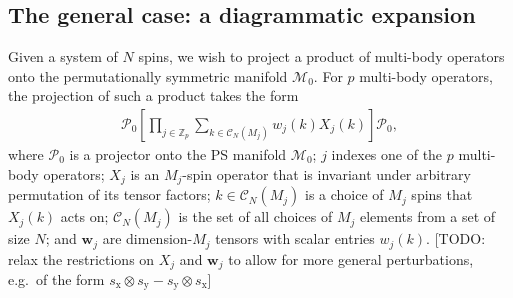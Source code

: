 \documentclass[nofootinbib,notitlepage,11pt]{revtex4-2}
\newcommand{\p}[1]{\left(#1\right)} %
\renewcommand{\sp}[1]{\left[#1\right]} %
\newcommand{\m}{\bm} %
\newcommand{\1}{\mathds{1}}
\newcommand{\x}{\text{x}}
\newcommand{\y}{\text{y}}
\newcommand{\C}{\mathcal{C}}
\newcommand{\M}{\mathcal{M}}
\renewcommand{\P}{\mathcal{P}}
\newcommand{\ZZ}{\mathbb{Z}}
\newcommand{\red}[1]{{\color{red} #1}}
\begin{document}
\subsection{The general case: a diagrammatic expansion}

Given a system of $N$ spins, we wish to project a product of
multi-body operators onto the permutationally symmetric manifold
$\M_0$.  For $p$ multi-body operators, the projection of such a
product takes the form
\begin{align}
  \P_0 \sp{\prod_{j\in\ZZ_p}
    \sum_{k\in\C_N\p{M_j}} w_j\p{k} X_j\p{k}} \P_0,
  \label{eq:sym_prod_proj}
\end{align}
where $\P_0$ is a projector onto the PS manifold $\M_0$; $j$ indexes
one of the $p$ multi-body operators; $X_j$ is an $M_j$-spin operator
that is invariant under arbitrary permutation of its tensor factors;
$k\in\C_N\p{M_j}$ is a choice of $M_j$ spins that $X_j\p{k}$ acts on;
$\C_N\p{M_j}$ is the set of all choices of $M_j$ elements from a set
of size $N$; and $\m w_j$ are dimension-$M_j$ tensors with scalar
entries $w_j\p{k}$. \red{[TODO: relax the restrictions on $X_j$ and
  $\m w_j$ to allow for more general perturbations, e.g.~of the form
  $s_\x\otimes s_\y-s_\y\otimes s_\x$]}
\end{document}
